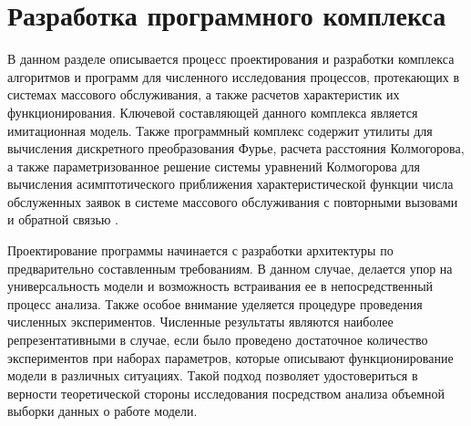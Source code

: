 \section {Разработка программного комплекса}
В данном разделе описывается процесс проектирования и разработки комплекса алгоритмов и программ для численного исследования процессов, протекающих в системах массового обслуживания, а также расчетов характеристик их функционирования. Ключевой составляющей данного комплекса является имитационная модель. Также программный комплекс содержит утилиты для вычисления дискретного преобразования Фурье, расчета расстояния Колмогорова, а также параметризованное решение системы уравнений Колмогорова для вычисления асимптотического приближения характеристической функции числа обслуженных заявок в системе массового обслуживания с повторными вызовами и обратной связью \cite{blaginin2021approximation}.

Проектирование программы начинается с разработки архитектуры по предварительно составленным требованиям. В данном случае, делается упор на универсальность модели и возможность встраивания ее в непосредственный процесс анализа. Также особое внимание уделяется процедуре проведения численных экспериментов. Численные результаты являются наиболее репрезентативными в случае, если было проведено достаточное количество экспериментов при наборах параметров, которые описывают функционирование модели в различных ситуациях. Такой подход позволяет удостовериться в верности теоретической стороны исследования посредством анализа объемной выборки данных о работе модели.


